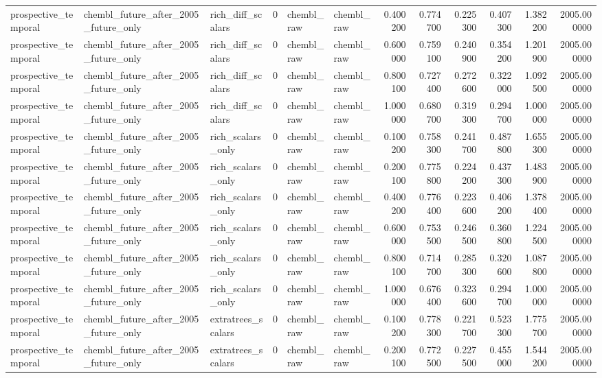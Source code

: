 \begin{longtable}{lllrllrrrrrr}
prospective\_temporal & chembl\_future\_after\_2005\_future\_only & rich\_diff\_scalars & 0 & chembl\_raw & chembl\_raw & 0.400200 & 0.774700 & 0.225300 & 0.407300 & 1.382200 & 2005.000000 \\
prospective\_temporal & chembl\_future\_after\_2005\_future\_only & rich\_diff\_scalars & 0 & chembl\_raw & chembl\_raw & 0.600000 & 0.759100 & 0.240900 & 0.354200 & 1.201900 & 2005.000000 \\
prospective\_temporal & chembl\_future\_after\_2005\_future\_only & rich\_diff\_scalars & 0 & chembl\_raw & chembl\_raw & 0.800100 & 0.727400 & 0.272600 & 0.322000 & 1.092500 & 2005.000000 \\
prospective\_temporal & chembl\_future\_after\_2005\_future\_only & rich\_diff\_scalars & 0 & chembl\_raw & chembl\_raw & 1.000000 & 0.680700 & 0.319300 & 0.294700 & 1.000000 & 2005.000000 \\
prospective\_temporal & chembl\_future\_after\_2005\_future\_only & rich\_scalars\_only & 0 & chembl\_raw & chembl\_raw & 0.100200 & 0.758300 & 0.241700 & 0.487800 & 1.655300 & 2005.000000 \\
prospective\_temporal & chembl\_future\_after\_2005\_future\_only & rich\_scalars\_only & 0 & chembl\_raw & chembl\_raw & 0.200100 & 0.775800 & 0.224200 & 0.437300 & 1.483900 & 2005.000000 \\
prospective\_temporal & chembl\_future\_after\_2005\_future\_only & rich\_scalars\_only & 0 & chembl\_raw & chembl\_raw & 0.400200 & 0.776400 & 0.223600 & 0.406200 & 1.378400 & 2005.000000 \\
prospective\_temporal & chembl\_future\_after\_2005\_future\_only & rich\_scalars\_only & 0 & chembl\_raw & chembl\_raw & 0.600000 & 0.753500 & 0.246500 & 0.360800 & 1.224500 & 2005.000000 \\
prospective\_temporal & chembl\_future\_after\_2005\_future\_only & rich\_scalars\_only & 0 & chembl\_raw & chembl\_raw & 0.800100 & 0.714700 & 0.285300 & 0.320600 & 1.087800 & 2005.000000 \\
prospective\_temporal & chembl\_future\_after\_2005\_future\_only & rich\_scalars\_only & 0 & chembl\_raw & chembl\_raw & 1.000000 & 0.676400 & 0.323600 & 0.294700 & 1.000000 & 2005.000000 \\
prospective\_temporal & chembl\_future\_after\_2005\_future\_only & extratrees\_scalars & 0 & chembl\_raw & chembl\_raw & 0.100200 & 0.778300 & 0.221700 & 0.523300 & 1.775700 & 2005.000000 \\
prospective\_temporal & chembl\_future\_after\_2005\_future\_only & extratrees\_scalars & 0 & chembl\_raw & chembl\_raw & 0.200100 & 0.772500 & 0.227500 & 0.455000 & 1.544200 & 2005.000000 \\

\end{longtable}
